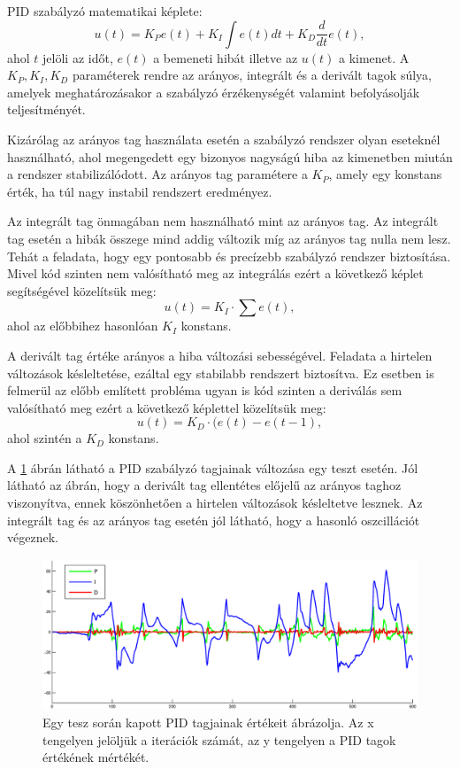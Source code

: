 PID szabályzó matematikai képlete: $$u(t)=K_{P}e(t)+K_{I}\int e(t)dt+K_{D}\frac{d}{dt}e(t),$$ ahol $t$ jelöli az időt, $e(t)$ a bemeneti hibát illetve az $u(t)$ a kimenet. A $K_{P}, K_{I}, K_{D}$ paraméterek rendre az arányos, integrált és a derivált tagok súlya, amelyek meghatározásakor a szabályzó érzékenységét valamint befolyásolják teljesítményét.

Kizárólag az arányos tag használata esetén a szabályzó rendszer olyan eseteknél használható, ahol megengedett egy bizonyos nagyságú hiba az kimenetben miután a rendszer stabilizálódott. Az arányos tag paramétere a $K_{P}$, amely egy konstans érték, ha túl nagy instabil rendszert eredményez.

Az integrált tag önmagában nem használható mint az arányos tag. Az integrált tag esetén a hibák összege mind addig változik míg az arányos tag nulla nem lesz. Tehát a feladata, hogy egy pontosabb és precízebb szabályzó rendszer biztosítása. Mivel kód szinten nem valósítható meg az integrálás ezért a következő képlet segítségével közelítsük meg:$$u(t)=K_{I}\cdot\sum e(t),$$ ahol az előbbihez hasonlóan $K_{I}$ konstans.

A derivált tag értéke arányos a hiba változási sebességével. Feladata a hirtelen változások késleltetése, ezáltal egy stabilabb rendszert biztosítva. Ez esetben is felmerül az előbb említett probléma ugyan is kód szinten a deriválás sem valósítható meg ezért a következő képlettel közelítsük meg:$$u(t)=K_{D}\cdot (e(t) - e(t-1),$$ ahol szintén a $K_{D}$ konstans.

A \ref{pidFig} ábrán látható a PID szabályzó tagjainak változása egy teszt esetén. Jól látható az ábrán, hogy a derivált tag ellentétes előjelű az arányos taghoz viszonyítva, ennek köszönhetően a hirtelen változások késleltetve lesznek. Az integrált tag és az arányos tag esetén jól látható, hogy a hasonló oszcillációt végeznek.

\begin{figure}[!hp]
	\centering
	\includegraphics[width=1\linewidth]{images/pid.eps}
	\captionsetup{justification=centering,margin=1.5cm}
	\caption[Egy tesz során kapott PID tagjainak értékeit ábrázolja]
	{Egy tesz során kapott PID tagjainak értékeit ábrázolja. Az x tengelyen jelöljük a iterációk számát,	az y tengelyen a PID tagok értékének mértékét.}
	\label{pidFig}
\end{figure}

